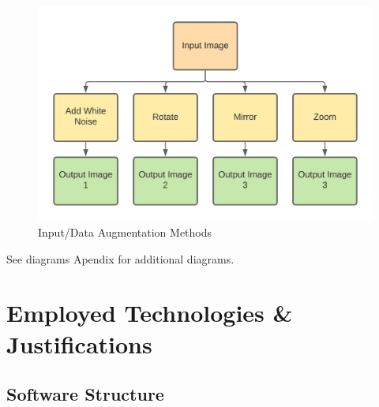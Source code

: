     \begin{figure}[H]
      \begin{center}
        \includegraphics[scale=0.7]{Images/Data_Augmentation}
        \caption{Input/Data Augmentation Methods}
        \label{fig:data_augmentation}
      \end{center}
    \end{figure}
  See diagrams Apendix for additional diagrams.
\section{Employed Technologies \& Justifications}
  \subsection{Software Structure}

